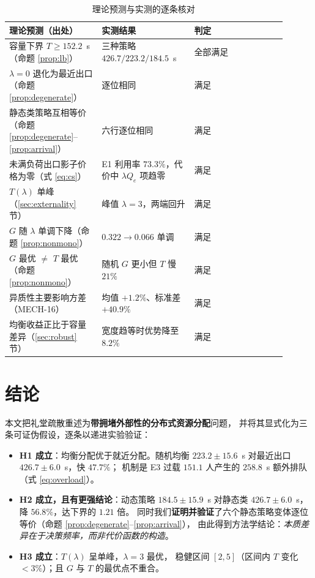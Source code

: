 \begin{table}[H]
  \centering
  \caption{理论预测与实测的逐条核对}
  \label{tab:verify}
  \begin{tabular}{p{0.30\linewidth}p{0.30\linewidth}p{0.30\linewidth}}
    \toprule
    理论预测（出处） & 实测结果 & 判定 \\
    \midrule
    容量下界 $T\ge152.2$~s（命题 \ref{prop:lb}） & 三种策略 $426.7/223.2/184.5$~s & 全部满足 \\
    $\lambda=0$ 退化为最近出口（命题 \ref{prop:degenerate}） & 逐位相同 & 满足 \\
    静态类策略互相等价（命题 \ref{prop:degenerate}--\ref{prop:arrival}） & 六行逐位相同 & 满足 \\
    未满负荷出口影子价格为零（式 \eqref{eq:cs}） & E1 利用率 $73.3\%$，代价中 $\lambda Q_e$ 项趋零 & 满足 \\
    $T(\lambda)$ 单峰（\ref{sec:externality} 节） & 峰值 $\lambda=3$，两端回升 & 满足 \\
    $G$ 随 $\lambda$ 单调下降（命题 \ref{prop:nonmono}） & $0.322\to0.066$ 单调 & 满足 \\
    $G$ 最优 $\ne$ $T$ 最优（命题 \ref{prop:nonmono}） & 随机 $G$ 更小但 $T$ 慢 $21\%$ & 满足 \\
    异质性主要影响方差（MECH-16） & 均值 $+1.2\%$、标准差 $+40.9\%$ & 满足 \\
    均衡收益正比于容量差异（\ref{sec:robust} 节） & 宽度趋等时优势降至 $8.2\%$ & 满足 \\
    \bottomrule
  \end{tabular}
\end{table}

\section{结论}
\label{sec:conclusion}

本文把礼堂疏散重述为\textbf{带拥堵外部性的分布式资源分配}问题，
并将其显式化为三条可证伪假设，逐条以递进实验验证：

\begin{itemize}
  \item \textbf{H1 成立}：均衡分配优于就近分配。随机均衡
        $223.2\pm15.6$~s 对最近出口 $426.7\pm6.0$~s，快 $47.7\%$；
        机制是 E3 过载 $151.1$ 人产生的 $258.8$~s 额外排队（式 \eqref{eq:overload}）。
  \item \textbf{H2 成立，且有更强结论}：动态策略 $184.5\pm15.9$~s
        对静态类 $426.7\pm6.0$~s，降 $56.8\%$，达下界的 $1.21$ 倍。
        同时我们\textbf{证明并验证}了六个静态策略变体逐位等价（命题 \ref{prop:degenerate}--\ref{prop:arrival}），
        由此得到方法学结论：\emph{本质差异在于决策频率，而非代价函数的构造}。
  \item \textbf{H3 成立}：$T(\lambda)$ 呈单峰，$\lambda=3$ 最优，
        稳健区间 $[2,5]$（区间内 $T$ 变化 $<3\%$）；且 $G$ 与 $T$ 的最优点不重合。
\end{itemize}

